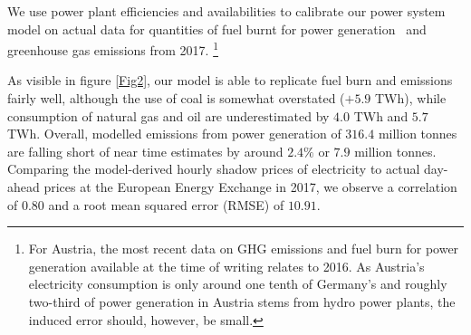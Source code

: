 \documentclass[preprint, 12pt, authoryear]{elsarticle}
\begin{document}
We use power plant efficiencies and availabilities to calibrate our power system model on actual data for quantities of fuel burnt for power generation~\citep{AGEB2018, OeStat2018} and greenhouse gas emissions \citep{UBA_DE2018a, UBA_DE2018b} from 2017.
\footnote{For Austria, the most recent data on GHG emissions and fuel burn for power generation available at the time of writing relates to 2016. As Austria’s electricity consumption is only around one tenth of Germany’s and roughly two-third of power generation in Austria stems from hydro power plants, the induced error should, however, be small.} 

As visible in figure \ref{Fig2}, our model is able to replicate fuel burn and emissions fairly well, although the use of coal is somewhat overstated ($+5.9$ TWh), while consumption of natural gas and oil are underestimated by $4.0$ TWh and $5.7$ TWh. Overall, modelled  emissions from power generation of $316.4$ million tonnes are falling short of near time estimates by around $2.4\%$ or $7.9$ million tonnes.
Comparing the model-derived hourly shadow prices of electricity to actual day-ahead prices at the European Energy Exchange in 2017, we observe a correlation of $0.80$ and a root mean squared error (RMSE) of $10.91$.

\end{document}
